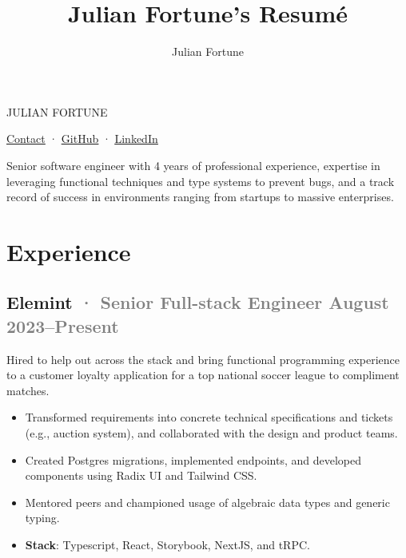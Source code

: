 \documentclass[12pt]{article} %
\title{Julian Fortune's Resumé}
\author{Julian Fortune}
\providecommand{\tightlist}{%
  \setlength{\itemsep}{0pt}\setlength{\parskip}{0pt}}
\let\defaultref\href
\renewcommand{\href}[2]{%
  \defaultref{#1}{\ul{#2}}%
}
\newcommand{\link}[2]{\href{#1}{#2}}
\renewcommand{\emph}[1]{%
  \textcolor{gray}{#1}%
}
\def\separator{ · {}}
\begin{document}
\begin{bfseries}\begin{huge}
  {\selectfont%
    \MakeTextUppercase{Julian Fortune}
  }
\end{huge}\end{bfseries}

  \link{https://julianfortune.com}{Contact}\separator%
    \link{http://github.com/julianfortune}{GitHub}\separator%
\link{http://linkedin.com/in/julianfortune}{LinkedIn}%


\vspace{0.5em}

Senior software engineer with 4 years of professional experience,
expertise in leveraging functional techniques and type systems to
prevent bugs, and a track record of success in environments ranging from
startups to massive enterprises.

\hypertarget{experience}{%
\section{Experience}\label{experience}}

\hypertarget{elemint-senior-full-stack-engineer-august-2023present}{%
\subsection{\texorpdfstring{Elemint \emph{· \small Senior Full-stack
Engineer \hfill August
2023--Present}}{Elemint · Senior Full-stack Engineer August 2023--Present}}\label{elemint-senior-full-stack-engineer-august-2023present}}

Hired to help out across the stack and bring functional programming
experience to a customer loyalty application for a top national soccer
league to compliment matches.

\begin{itemize}
\tightlist
\item
  Transformed requirements into concrete technical specifications and
  tickets (e.g., auction system), and collaborated with the design and
  product teams.
\item
  Created Postgres migrations, implemented endpoints, and developed
  components using Radix UI and Tailwind CSS.
\item
  Mentored peers and championed usage of algebraic data types and
  generic typing.
\item
  \textbf{Stack}: Typescript, React, Storybook, NextJS, and tRPC.
\end{itemize}
\end{document}
